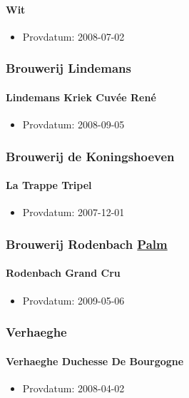 \documentclass[11pt]{article}
\begin{document}
\paragraph{Wit}
\label{sec:orgb72d629}
\begin{itemize}
\item Provdatum: 2008-07-02
\end{itemize}
\subsubsection{Brouwerij Lindemans}
\label{sec:org1d23f46}
\paragraph{Lindemans Kriek Cuvée René}
\label{sec:org63e763a}
\begin{itemize}
\item Provdatum: 2008-09-05
\end{itemize}
\subsubsection{Brouwerij de Koningshoeven}
\label{sec:org8e9b831}
\paragraph{La Trappe Tripel}
\label{sec:org2586062}
\begin{itemize}
\item Provdatum: 2007-12-01
\end{itemize}
\subsubsection{Brouwerij Rodenbach \underline{Palm}}
\label{sec:org5d5a448}
\paragraph{Rodenbach Grand Cru}
\label{sec:orgf27ccb0}
\begin{itemize}
\item Provdatum: 2009-05-06
\end{itemize}
\subsubsection{Verhaeghe}
\label{sec:org1e2965d}
\paragraph{Verhaeghe Duchesse De Bourgogne}
\label{sec:org8352171}
\begin{itemize}
\item Provdatum: 2008-04-02
\end{itemize}
\end{document}

